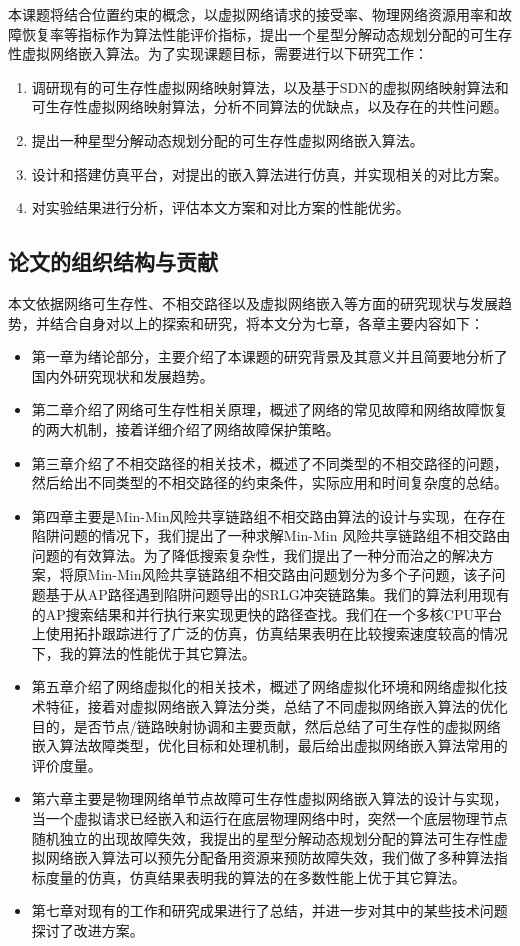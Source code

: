 本课题将结合位置约束的概念，以虚拟网络请求的接受率、物理网络资源用率和故障恢复率等指标作为算法性能评价指标，提出一个星型分解动态规划分配的可生存性虚拟网络嵌入算法。为了实现课题目标，需要进行以下研究工作：
\begin{enumerate}
  \item 调研现有的可生存性虚拟网络映射算法，以及基于SDN的虚拟网络映射算法和可生存性虚拟网络映射算法，分析不同算法的优缺点，以及存在的共性问题。
  \item 提出一种星型分解动态规划分配的可生存性虚拟网络嵌入算法。
  \item 设计和搭建仿真平台，对提出的嵌入算法进行仿真，并实现相关的对比方案。
  \item 对实验结果进行分析，评估本文方案和对比方案的性能优劣。
\end{enumerate}


\subsection{论文的组织结构与贡献}
本文依据网络可生存性、不相交路径以及虚拟网络嵌入等方面的研究现状与发展趋势，并结合自身对以上的探索和研究，将本文分为七章，各章主要内容如下：
\begin{itemize}
  \item 第一章为绪论部分，主要介绍了本课题的研究背景及其意义并且简要地分析了国内外研究现状和发展趋势。
  \item 第二章介绍了网络可生存性相关原理，概述了网络的常见故障和网络故障恢复的两大机制，接着详细介绍了网络故障保护策略。
  \item 第三章介绍了不相交路径的相关技术，概述了不同类型的不相交路径的问题，然后给出不同类型的不相交路径的约束条件，实际应用和时间复杂度的总结。
  \item 第四章主要是Min-Min风险共享链路组不相交路由算法的设计与实现，在存在陷阱问题的情况下，我们提出了一种求解Min-Min 风险共享链路组不相交路由问题的有效算法。为了降低搜索复杂性，我们提出了一种分而治之的解决方案，将原Min-Min风险共享链路组不相交路由问题划分为多个子问题，该子问题基于从AP路径遇到陷阱问题导出的SRLG冲突链路集。我们的算法利用现有的AP搜索结果和并行执行来实现更快的路径查找。我们在一个多核CPU平台上使用拓扑跟踪进行了广泛的仿真，仿真结果表明在比较搜索速度较高的情况下，我的算法的性能优于其它算法。
  \item 第五章介绍了网络虚拟化的相关技术，概述了网络虚拟化环境和网络虚拟化技术特征，接着对虚拟网络嵌入算法分类，总结了不同虚拟网络嵌入算法的优化目的，是否节点/链路映射协调和主要贡献，然后总结了可生存性的虚拟网络嵌入算法故障类型，优化目标和处理机制，最后给出虚拟网络嵌入算法常用的评价度量。
  \item 第六章主要是物理网络单节点故障可生存性虚拟网络嵌入算法的设计与实现，当一个虚拟请求已经嵌入和运行在底层物理网络中时，突然一个底层物理节点随机独立的出现故障失效，我提出的星型分解动态规划分配的算法可生存性虚拟网络嵌入算法可以预先分配备用资源来预防故障失效，我们做了多种算法指标度量的仿真，仿真结果表明我的算法的在多数性能上优于其它算法。
  \item 第七章对现有的工作和研究成果进行了总结，并进一步对其中的某些技术问题探讨了改进方案。
\end{itemize}
